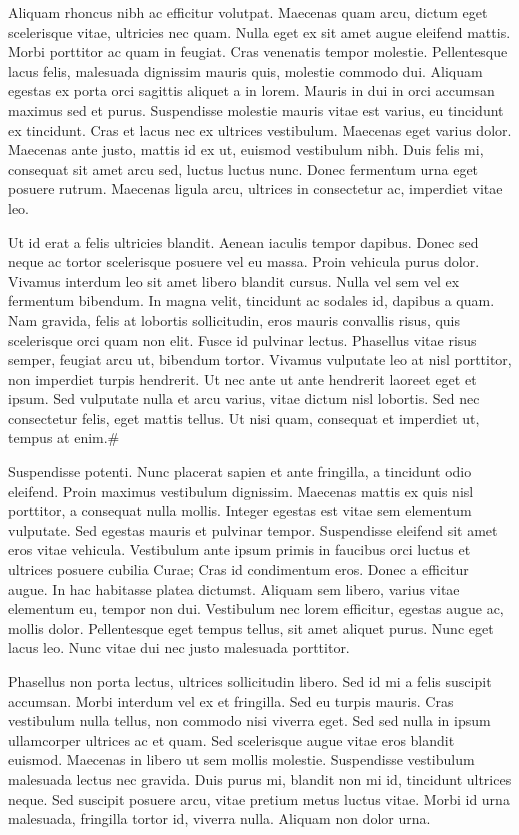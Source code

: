 Aliquam rhoncus nibh ac efficitur volutpat. Maecenas quam arcu, dictum eget scelerisque vitae, ultricies nec quam. Nulla eget ex sit amet augue eleifend mattis. Morbi porttitor ac quam in feugiat. Cras venenatis tempor molestie. Pellentesque lacus felis, malesuada dignissim mauris quis, molestie commodo dui. Aliquam egestas ex porta orci sagittis aliquet a in lorem. Mauris in dui in orci accumsan maximus sed et purus. Suspendisse molestie mauris vitae est varius, eu tincidunt ex tincidunt. Cras et lacus nec ex ultrices vestibulum. Maecenas eget varius dolor. Maecenas ante justo, mattis id ex ut, euismod vestibulum nibh. Duis felis mi, consequat sit amet arcu sed, luctus luctus nunc. Donec fermentum urna eget posuere rutrum. Maecenas ligula arcu, ultrices in consectetur ac, imperdiet vitae leo.

Ut id erat a felis ultricies blandit. Aenean iaculis tempor dapibus. Donec sed neque ac tortor scelerisque posuere vel eu massa. Proin vehicula purus dolor. Vivamus interdum leo sit amet libero blandit cursus. Nulla vel sem vel ex fermentum bibendum. In magna velit, tincidunt ac sodales id, dapibus a quam. Nam gravida, felis at lobortis sollicitudin, eros mauris convallis risus, quis scelerisque orci quam non elit. Fusce id pulvinar lectus. Phasellus vitae risus semper, feugiat arcu ut, bibendum tortor. Vivamus vulputate leo at nisl porttitor, non imperdiet turpis hendrerit. Ut nec ante ut ante hendrerit laoreet eget et ipsum. Sed vulputate nulla et arcu varius, vitae dictum nisl lobortis. Sed nec consectetur felis, eget mattis tellus. Ut nisi quam, consequat et imperdiet ut, tempus at enim.\#

Suspendisse potenti. Nunc placerat sapien et ante fringilla, a tincidunt odio eleifend. Proin maximus vestibulum dignissim. Maecenas mattis ex quis nisl porttitor, a consequat nulla mollis. Integer egestas est vitae sem elementum vulputate. Sed egestas mauris et pulvinar tempor. Suspendisse eleifend sit amet eros vitae vehicula. Vestibulum ante ipsum primis in faucibus orci luctus et ultrices posuere cubilia Curae; Cras id condimentum eros. Donec a efficitur augue. In hac habitasse platea dictumst. Aliquam sem libero, varius vitae elementum eu, tempor non dui. Vestibulum nec lorem efficitur, egestas augue ac, mollis dolor. Pellentesque eget tempus tellus, sit amet aliquet purus. Nunc eget lacus leo. Nunc vitae dui nec justo malesuada porttitor.

Phasellus non porta lectus, ultrices sollicitudin libero. Sed id mi a felis suscipit accumsan. Morbi interdum vel ex et fringilla. Sed eu turpis mauris. Cras vestibulum nulla tellus, non commodo nisi viverra eget. Sed sed nulla in ipsum ullamcorper ultrices ac et quam. Sed scelerisque augue vitae eros blandit euismod. Maecenas in libero ut sem mollis molestie. Suspendisse vestibulum malesuada lectus nec gravida. Duis purus mi, blandit non mi id, tincidunt ultrices neque. Sed suscipit posuere arcu, vitae pretium metus luctus vitae. Morbi id urna malesuada, fringilla tortor id, viverra nulla. Aliquam non dolor urna.


